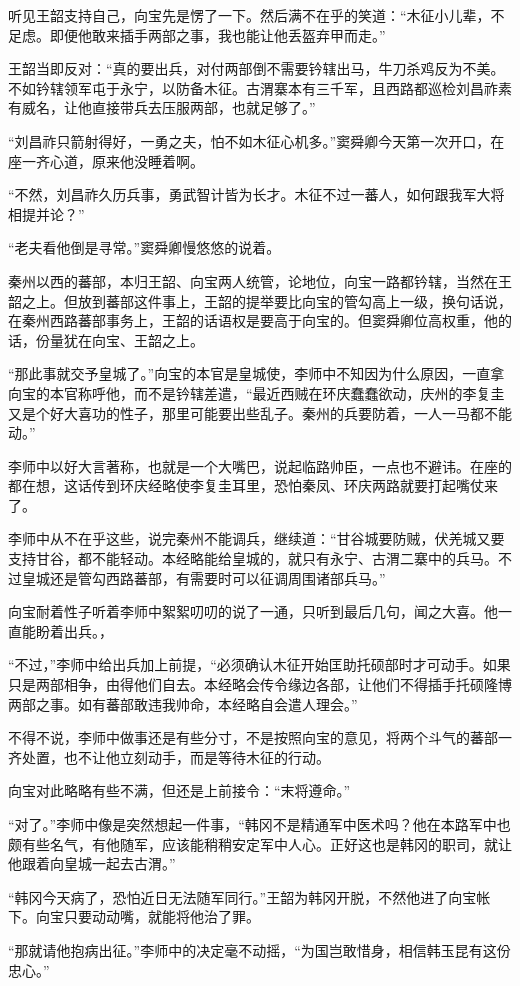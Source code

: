 听见王韶支持自己，向宝先是愣了一下。然后满不在乎的笑道：“木征小儿辈，不足虑。即便他敢来插手两部之事，我也能让他丢盔弃甲而走。”

王韶当即反对：“真的要出兵，对付两部倒不需要钤辖出马，牛刀杀鸡反为不美。不如钤辖领军屯于永宁，以防备木征。古渭寨本有三千军，且西路都巡检刘昌祚素有威名，让他直接带兵去压服两部，也就足够了。”

“刘昌祚只箭射得好，一勇之夫，怕不如木征心机多。”窦舜卿今天第一次开口，在座一齐心道，原来他没睡着啊。

“不然，刘昌祚久历兵事，勇武智计皆为长才。木征不过一蕃人，如何跟我军大将相提并论？”

“老夫看他倒是寻常。”窦舜卿慢悠悠的说着。

秦州以西的蕃部，本归王韶、向宝两人统管，论地位，向宝一路都钤辖，当然在王韶之上。但放到蕃部这件事上，王韶的提举要比向宝的管勾高上一级，换句话说，在秦州西路蕃部事务上，王韶的话语权是要高于向宝的。但窦舜卿位高权重，他的话，份量犹在向宝、王韶之上。

“那此事就交予皇城了。”向宝的本官是皇城使，李师中不知因为什么原因，一直拿向宝的本官称呼他，而不是钤辖差遣，“最近西贼在环庆蠢蠢欲动，庆州的李复圭又是个好大喜功的性子，那里可能要出些乱子。秦州的兵要防着，一人一马都不能动。”

李师中以好大言著称，也就是一个大嘴巴，说起临路帅臣，一点也不避讳。在座的都在想，这话传到环庆经略使李复圭耳里，恐怕秦凤、环庆两路就要打起嘴仗来了。

李师中从不在乎这些，说完秦州不能调兵，继续道：“甘谷城要防贼，伏羌城又要支持甘谷，都不能轻动。本经略能给皇城的，就只有永宁、古渭二寨中的兵马。不过皇城还是管勾西路蕃部，有需要时可以征调周围诸部兵马。”

向宝耐着性子听着李师中絮絮叨叨的说了一通，只听到最后几句，闻之大喜。他一直能盼着出兵。，

“不过，”李师中给出兵加上前提，“必须确认木征开始匡助托硕部时才可动手。如果只是两部相争，由得他们自去。本经略会传令缘边各部，让他们不得插手托硕隆博两部之事。如有蕃部敢违我帅命，本经略自会遣人理会。”

不得不说，李师中做事还是有些分寸，不是按照向宝的意见，将两个斗气的蕃部一齐处置，也不让他立刻动手，而是等待木征的行动。

向宝对此略略有些不满，但还是上前接令：“末将遵命。”

“对了。”李师中像是突然想起一件事，“韩冈不是精通军中医术吗？他在本路军中也颇有些名气，有他随军，应该能稍稍安定军中人心。正好这也是韩冈的职司，就让他跟着向皇城一起去古渭。”

“韩冈今天病了，恐怕近日无法随军同行。”王韶为韩冈开脱，不然他进了向宝帐下。向宝只要动动嘴，就能将他治了罪。

“那就请他抱病出征。”李师中的决定毫不动摇，“为国岂敢惜身，相信韩玉昆有这份忠心。”


